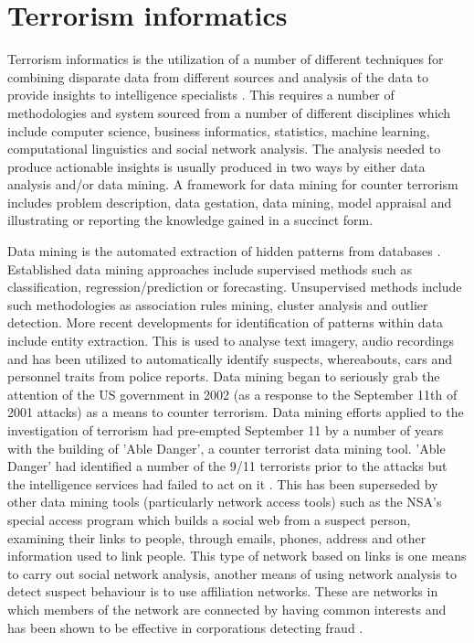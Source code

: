 \section{Terrorism informatics}

Terrorism informatics is the utilization of a number of different techniques for combining disparate data from different sources and analysis of the data to provide insights to intelligence specialists \citep{chau2015intelligence}. This requires a number of methodologies and system sourced from a number of different disciplines which include computer science, business informatics, statistics, machine learning, computational linguistics and social network analysis. The analysis needed to produce actionable insights is usually produced in two ways by either data analysis and/or data mining. A framework for data mining for counter terrorism  includes problem description, data gestation, data mining, model appraisal and illustrating or reporting the knowledge gained in a succinct form.

Data mining is the automated extraction of hidden patterns from databases \citep{shmueli2016data}. Established data mining approaches include supervised methods such as  classification, regression/prediction or forecasting. Unsupervised methods include such methodologies as association rules mining, cluster analysis and outlier detection. More recent developments for identification of patterns within data include entity extraction. This is used to analyse text imagery, audio recordings and has been utilized to automatically identify suspects, whereabouts, cars and personnel traits from police reports. Data mining began to seriously grab the attention of the US government in 2002 (as a response to the September 11th of 2001 attacks) as a means to counter terrorism. Data mining efforts applied to the investigation of terrorism had pre-empted September 11 by a number of years with the building of 'Able Danger', a counter terrorist data mining tool. 'Able Danger' \citep{keefe2006can} had identified a number of the 9/11 terrorists prior to the attacks but the intelligence services had failed to act on it \citep{lance2006triple}. This has been superseded by other data mining tools (particularly network access tools) such as the NSA's special access program which builds a social web from a suspect person, examining their links to people, through emails, phones, address and other information used to link people. This type of network based on links is one means to carry out social network analysis, another means of using network analysis to detect suspect behaviour is to use affiliation networks. These are networks in which members of the network are connected by having common interests and has been shown to be effective in corporations detecting fraud \citep{ben2009organised}.

